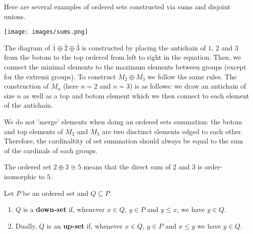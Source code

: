 \begin{example}
  Here are several examples of ordered sets constructed via sums and disjoint unions.
  \begin{center}
    \texttt{[image: images/sums.png]}
  \end{center}

  The diagram of $\bar 1 \oplus \bar 2 \oplus \bar 3$ is constructed by placing the antichain of $1$, $2$ and $3$ from the botom to the top ordered from left to right in the equation. Then, we connect the minimal elements to the maximum elements between groups (except for the extremi groups).
  To construct $M_2 \oplus M_3$ we follow the same rules. The construction of $M_n$ (here $n=2$ and $n=3$) is as follows: we draw an antichain of size $n$ as well as a top and botom element which we then connect to each element of the antichain.

   \begin{remark}
	   We do not 'merge' elements when doing an ordered sets summation: the botom and top elements of $M_2$ and $M_3$ are two disctinct elements edged to each other. Therefore, the cardinaltity of set summation should always be equal to the sum of the cardinals of each groups.
   \end{remark}

  The ordered set $2 \oplus 3 \cong 5$ means that the direct sum of $2$ and $3$ is order-isomorphic to $5$.
\end{example}



\begin{definition}
Let $P$ be an ordered set and $Q \subseteq P$.
\begin{enumerate}
\item $Q$ is a \textbf{down-set} if, whenever $x \in Q$, $y \in P$ and $y \leq x$, we have $y \in Q$.
\item Dually, $Q$ is an \textbf{up-set} if, whenever $x \in Q$, $y \in P$ and $x \leq y$ we have $y \in Q$.
\end{enumerate}
\end{definition}

